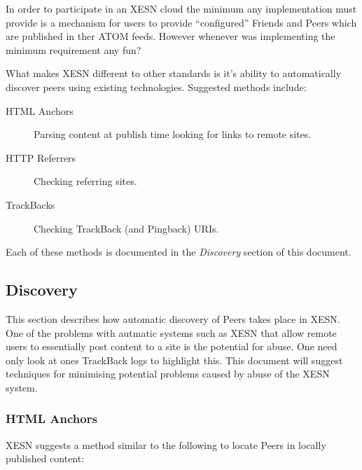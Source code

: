 \documentclass[titlepage,english,a4paper,twoside,dvips]{article}
\begin{document}
In order to participate in an XESN cloud the minimum any implementation must provide is a mechanism for users to provide ``configured'' Friends and Peers which are published in ther ATOM feeds.  However whenever was implementing the minimum requirement any fun?

What makes XESN different to other standards is it's ability to automatically discover peers using existing technologies.  Suggested methods include:

\begin{description}

\item[HTML Anchors] Parsing content at publish time looking for links to remote sites.

\item[HTTP Referrers] Checking referring sites.

\item[TrackBacks] Checking TrackBack (and Pingback) URIs.

\end{description}

Each of these methods is documented in the \emph{Discovery} section of this document. 

\subsection{Discovery}

This section describes how automatic discovery of Peers takes place in XESN.  One of the problems with autmatic systems such as XESN that allow remote users to essentially post content to a site is the potential for abuse.  One need only look at ones TrackBack logs to highlight this.  This document will suggest techniques for minimising potential problems caused by abuse of the XESN system.

\subsubsection{HTML Anchors}

XESN suggests a method similar to the following to locate Peers in locally published content:
\end{document}
